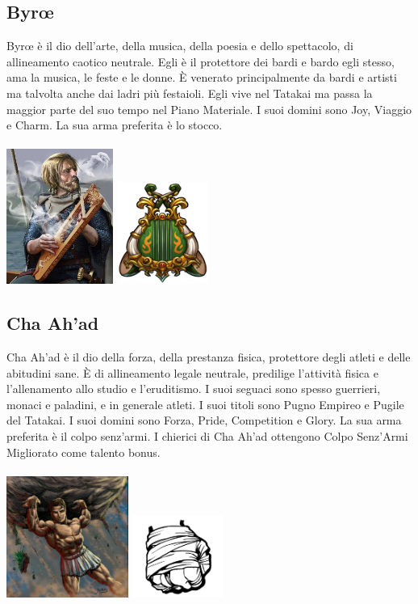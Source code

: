 \documentclass[10pt, a4paper]{report}
\begin{document}
\begin{multicols}{2}
\subsection*{Byrœ}
Byrœ è il dio dell'arte, della musica, della poesia e dello spettacolo, di allineamento caotico neutrale. Egli è il protettore dei bardi e bardo egli stesso, ama la musica, le feste e le donne. È venerato principalmente da bardi e artisti ma talvolta anche dai ladri più festaioli. Egli vive nel Tatakai ma passa la maggior parte del suo tempo nel Piano Materiale. I suoi domini sono Joy, Viaggio e Charm. La sua arma preferita è lo stocco.\\
\\
\includegraphics[width=3.5cm]{byroe.jpeg}
\includegraphics[width=3cm]{byroe_simbolo.png}
\subsection*{Cha Ah'ad}
Cha Ah'ad è il dio della forza, della prestanza fisica, protettore degli atleti e delle abitudini sane. È di allineamento legale neutrale, predilige l'attività fisica e l'allenamento allo studio e l'eruditismo. I suoi seguaci sono spesso guerrieri, monaci e paladini, e in generale atleti. I suoi titoli sono Pugno Empireo e Pugile del Tatakai. I suoi domini sono Forza, Pride, Competition e Glory. La sua arma preferita è il colpo senz'armi. I chierici di Cha Ah'ad ottengono Colpo Senz'Armi Migliorato come talento bonus.\\
\\
\includegraphics[width=4cm]{chaahad.jpeg}
\includegraphics[width=3cm]{chaahad_simbolo.png}

\end{multicols}
\end{document}
